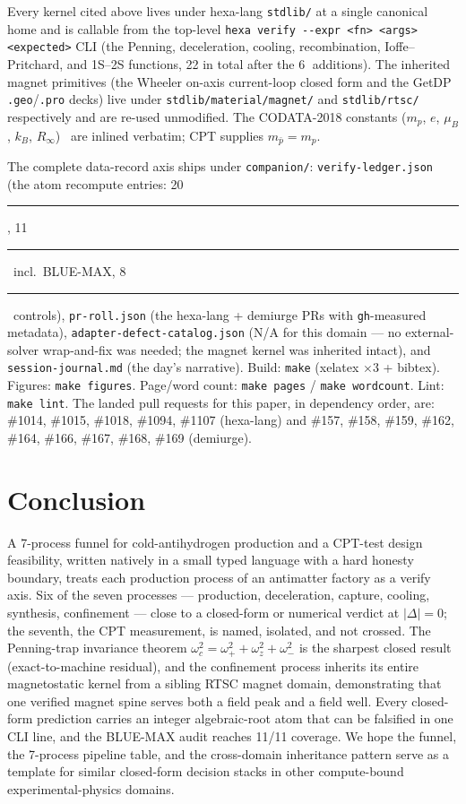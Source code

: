 \documentclass[11pt,a4paper]{article}
\newcommand{\tierdisc}[1]{\textcolor{#1}{\rule[0.05ex]{1.0ex}{1.0ex}}}
\newcommand{\tierBlue}{\tierdisc{blue!70!black}}
\newcommand{\tierGreen}{\tierdisc{green!60!black}}
\newcommand{\tierRed}{\tierdisc{red!80!black}}
\begin{document}
Every kernel cited above lives under hexa-lang \verb|stdlib/| at a single
canonical home and is callable from the top-level
\verb|hexa verify --expr <fn> <args> <expected>| CLI (the Penning,
deceleration, cooling, recombination, Ioffe--Pritchard, and 1S--2S
functions, 22 in total after the \textcircled{\scriptsize 6} additions). The
inherited magnet primitives (the Wheeler on-axis current-loop closed form and
the GetDP \verb|.geo|/\verb|.pro| decks) live under
\verb|stdlib/material/magnet/| and \verb|stdlib/rtsc/| respectively and are
re-used unmodified. The CODATA-2018 constants ($m_p$, $e$, $\mu_B$, $k_B$,
$R_\infty$)~\citep{mohr2018codata} are inlined verbatim; CPT supplies
$m_{\bar p}=m_p$.

\smallskip\noindent
The complete data-record axis ships under \texttt{companion/}:
\texttt{verify-ledger.json} (the atom recompute entries: 20 \tierGreen, 11
\tierBlue\ incl.\ BLUE-MAX, 8 \tierRed\ controls),
\texttt{pr-roll.json} (the hexa-lang + demiurge PRs with \texttt{gh}-measured
metadata), \texttt{adapter-defect-catalog.json} (N/A for this domain --- no
external-solver wrap-and-fix was needed; the magnet kernel was inherited
intact), and \texttt{session-journal.md} (the day's narrative). Build:
\texttt{make} (xelatex $\times 3$ + bibtex). Figures: \texttt{make figures}.
Page/word count: \texttt{make pages} / \texttt{make wordcount}. Lint:
\texttt{make lint}. The landed pull requests for this paper, in dependency
order, are: \#1014, \#1015, \#1018, \#1094, \#1107 (hexa-lang) and \#157,
\#158, \#159, \#162, \#164, \#166, \#167, \#168, \#169 (demiurge).

\section{Conclusion}
\label{sec:conclusion}

A 7-process funnel for cold-antihydrogen production and a CPT-test design
feasibility, written natively in a small typed language with a hard honesty
boundary, treats each production process of an antimatter factory as a verify
axis. Six of the seven processes --- production, deceleration, capture,
cooling, synthesis, confinement --- close to a closed-form or numerical
verdict at $|\Delta|=0$; the seventh, the CPT measurement, is named,
isolated, and not crossed. The Penning-trap invariance theorem
$\omega_c^2=\omega_+^2+\omega_z^2+\omega_-^2$ is the sharpest closed result
(exact-to-machine residual), and the confinement process inherits its entire
magnetostatic kernel from a sibling RTSC magnet domain, demonstrating that
one verified magnet spine serves both a field peak and a field well. Every
closed-form prediction carries an integer algebraic-root atom that can be
falsified in one CLI line, and the BLUE-MAX audit reaches 11/11 coverage. We
hope the funnel, the 7-process pipeline table, and the cross-domain
inheritance pattern serve as a template for similar closed-form decision
stacks in other compute-bound experimental-physics domains.
\end{document}
